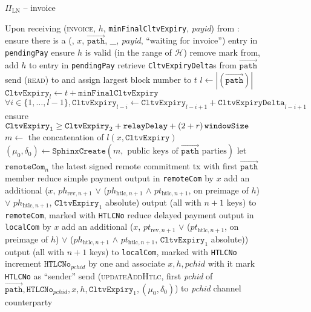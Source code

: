   \begin{figure}[H]
    \begin{protocolbox}{$\Pi_{\mathrm{LN}}$ -- invoice}
      \begin{algorithmic}[1]
        \State Upon receiving (\textsc{invoice}, $h$,
        \texttt{minFinalCltvExpiry}, \textit{payid}) from \bob:
        \Indent
          \State ensure there is a (\bob, $x$, $\overrightarrow{\mathtt{path}}$,
          \_, \textit{payid}, ``waiting for invoice'') entry in
          \texttt{pendingPay}
          \State ensure $h$ is valid (in the range of $\mathcal{H}$)
          \State remove mark from, add $h$ to entry in \texttt{pendingPay}
          \State retrieve \texttt{CltvExpiryDelta}s from
          $\overrightarrow{\mathtt{path}}$
          \State send (\textsc{read}) to \ledger{} and assign largest block
          number to $t$
          \State $l \gets |\left(\overrightarrow{\mathtt{path}}\right)|$
          \State $\mathtt{CltvExpiry}_l \gets t + \mathtt{minFinalCltvExpiry}$
          \State $\forall i \in \{1, \dots, l - 1\}, \mathtt{CltvExpiry}_{l - i}
          \gets \mathtt{CltvExpiry}_{l - i + 1} + \mathtt{CltvExpiryDelta}_{l -
          i + 1}$
          \label{alg:protocol:pay:invoice:cltv}
          \State ensure $\mathtt{CltvExpiry}_1 \geq \mathtt{CltvExpiry}_2 +
          \mathtt{relayDelay} + \left(2 + r\right)\texttt{windowSize}$
          \State $m \gets$ the concatenation of $l \left(x,
          \mathtt{CltvExpiry}\right)$
          \State $\left(\mu_0, \delta_0\right) \gets
          \mathtt{SphinxCreate}\left(m, \text{ public keys of }
          \overrightarrow{\mathtt{path}} \text{ parties}\right)$
          \State let $\mathtt{remoteCom}_n$ the latest signed remote commitment
          tx with first $\overrightarrow{\mathtt{path}}$ member
          \State reduce simple payment output in \texttt{remoteCom} by $x$
          \State add an additional ($x$, $ph_{\mathrm{rev}, n+1}$ $\vee$
          ($ph_{\mathrm{htlc}, n+1}$ $\wedge$ $pt_{\mathrm{htlc}, n+1}$,
          on preimage of $h$) $\vee$
          $ph_{\mathrm{htlc}, n+1}$, $\mathtt{CltvExpiry}_1$ absolute)
          output (all with $n+1$ keys) to \texttt{remoteCom}, marked with
          \texttt{HTLCNo}
          \State reduce delayed payment output in \texttt{localCom} by $x$
          \State add an additional ($x$, $pt_{\mathrm{rev}, n+1}$ $\vee$
          ($pt_{\mathrm{htlc}, n+1}$, on preimage of $h$) $\vee$
          ($ph_{\mathrm{htlc}, n+1}$ $\wedge$ $pt_{\mathrm{htlc}, n+1}$,
          $\mathtt{CltvExpiry}_1$ absolute)) output (all with $n+1$ keys) to
          \texttt{localCom}, marked with \texttt{HTLCNo}
          \State increment $\mathtt{HTLCNo}_{\mathit{pchid}}$ by one and
          associate $x, h, \mathit{pchid}$ with it
          \State mark \texttt{HTLCNo} as ``sender''
          \State send (\textsc{updateAddHtlc}, first \textit{pchid} of
          $\overrightarrow{\mathtt{path}}, \mathtt{HTLCNo}_{\mathit{pchid}}, x,
          h, \mathtt{CltvExpiry}_1, \left(\mu_0, \delta_0\right)$) to
          \textit{pchid} channel counterparty
        \EndIndent
      \end{algorithmic}
    \end{protocolbox}
    \caption{}
    \label{alg:protocol:pay:invoice}
  \end{figure}

